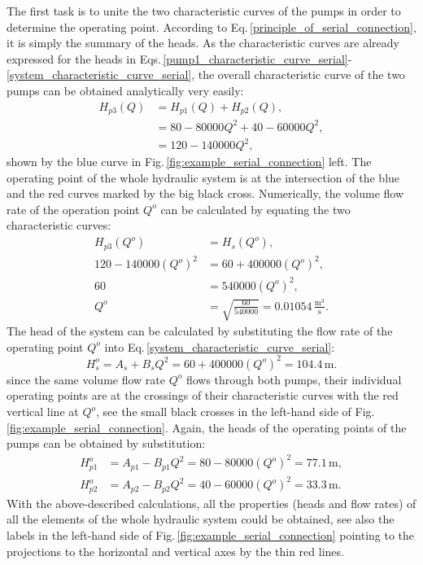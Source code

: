 The first task is to unite the two characteristic curves of the pumps in order to determine the operating point. According to Eq.\,\eqref{principle_of_serial_connection}, it is simply the summary of the heads. As the characteristic curves are already expressed for the heads in Eqs.\,\eqref{pump1_characteristic_curve_serial}-\eqref{system_characteristic_curve_serial}, the overall characteristic curve of the two pumps can be obtained analytically very easily:
%
\begin{equation}
\begin{split}
H_{p3}(Q) &= H_{p1}(Q) + H_{p2}(Q), \\
          &= 80 - 80000 Q^2 + 40 - 60000 Q^2, \\
		  &= 120 - 140000 Q^2,
\end{split}
\end{equation}
%
shown by the blue curve in Fig.\,\ref{fig:example_serial_connection} left. The operating point of the whole hydraulic system is at the intersection of the blue and the red curves marked by the big black cross. Numerically, the volume flow rate of the operation point $Q^o$ can be calculated by equating the two characteristic curves:
%
\begin{equation}
\begin{split}
         H_{p3}(Q^o) &= H_{s}(Q^o), \\
120 - 140000 (Q^o)^2 &= 60 + 400000 (Q^o)^2, \\
		          60 &= 540000 (Q^o)^2, \\
			     Q^o &= \sqrt{\frac{60}{540000}} = 0.01054\,\mathrm{\frac{m^3}{s}}.
\end{split}
\end{equation}
%
The head of the system can be calculated by substituting the flow rate of the operating point $Q^o$ into Eq.\,\eqref{system_characteristic_curve_serial}:
%
\begin{equation} \label{principle_of_serial_connection}
H_s^o = A_s + B_s Q^2 = 60 + 400000 (Q^o)^2 = 104.4\,\mathrm{m}.
\end{equation}
%
since the same volume flow rate $Q^o$ flows through both pumps, their individual operating points are at the crossings of their characteristic curves with the red vertical line at $Q^o$, see the small black crosses in the left-hand side of Fig.\,\ref{fig:example_serial_connection}. Again, the heads of the operating points of the pumps can be obtained by substitution:
%
\begin{align}
H_{p1}^o &= A_{p1} - B_{p1} Q^2 = 80 - 80000 (Q^o)^2 = 77.1\,\mathrm{m}, \\
H_{p2}^o &= A_{p2} - B_{p2} Q^2 = 40 - 60000 (Q^o)^2 = 33.3\,\mathrm{m}.
\end{align}
%
With the above-described calculations, all the properties (heads and flow rates) of all the elements of the whole hydraulic system could be obtained, see also the labels in the left-hand side of Fig.\,\ref{fig:example_serial_connection} pointing to the projections to the horizontal and vertical axes by the thin red lines.

